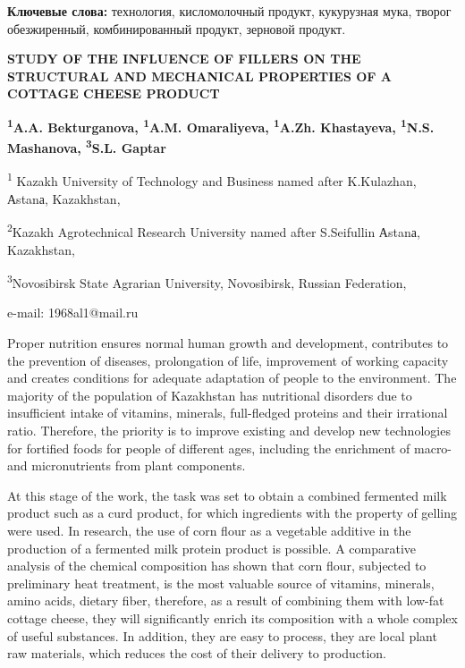 {\bfseries Ключевые слова:} технология, кисломолочный продукт, кукурузная
мука, творог обезжиренный, комбинированный продукт, зерновой продукт.

\begin{articleheader}
{\bfseries STUDY OF THE INFLUENCE OF FILLERS ON THE STRUCTURAL AND MECHANICAL PROPERTIES OF A COTTAGE CHEESE PRODUCT}

{\bfseries
\textsuperscript{1}A.A. Bekturganova\textsuperscript{\envelope },
\textsuperscript{1}A.M. Omaraliyeva,
\textsuperscript{1}A.Zh. Khastayeva,
\textsuperscript{1}N.S. Mashanova,
\textsuperscript{3}S.L. Gaptar
}
\end{articleheader}

\begin{affiliation}
\textsuperscript{1} Kazakh University of Technology and Business named
after K.Kulazhan, Аstanа, Kazakhstan,

\textsuperscript{2}Kazakh Agrotechnical Research University named after
S.Seifullin Аstanа, Kazakhstan,

\textsuperscript{3}Novosibirsk State Agrarian University, Novosibirsk,
Russian Federation,

e-mail: 1968al1@mail.ru
\end{affiliation}

Proper nutrition ensures normal human growth and development,
contributes to the prevention of diseases, prolongation of life,
improvement of working capacity and creates conditions for adequate
adaptation of people to the environment. The majority of the population
of Kazakhstan has nutritional disorders due to insufficient intake of
vitamins, minerals, full-fledged proteins and their irrational ratio.
Therefore, the priority is to improve existing and develop new
technologies for fortified foods for people of different ages, including
the enrichment of macro- and micronutrients from plant components.

At this stage of the work, the task was set to obtain a combined
fermented milk product such as a curd product, for which ingredients
with the property of gelling were used. In research, the use of corn
flour as a vegetable additive in the production of a fermented milk
protein product is possible. A comparative analysis of the chemical
composition has shown that corn flour, subjected to preliminary heat
treatment, is the most valuable source of vitamins, minerals, amino
acids, dietary fiber, therefore, as a result of combining them with
low-fat cottage cheese, they will significantly enrich its composition
with a whole complex of useful substances. In addition, they are easy to
process, they are local plant raw materials, which reduces the cost of
their delivery to production.

